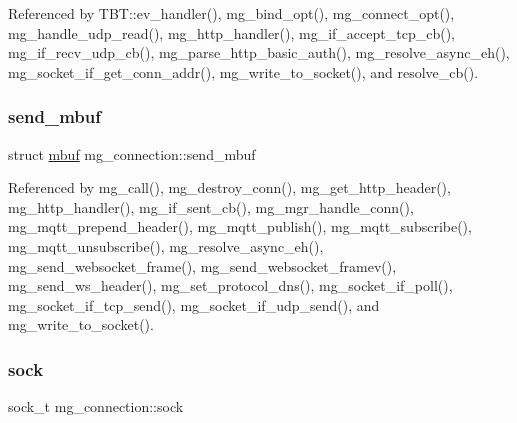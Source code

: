 Referenced by T\+B\+T\+::ev\+\_\+handler(), mg\+\_\+bind\+\_\+opt(), mg\+\_\+connect\+\_\+opt(), mg\+\_\+handle\+\_\+udp\+\_\+read(), mg\+\_\+http\+\_\+handler(), mg\+\_\+if\+\_\+accept\+\_\+tcp\+\_\+cb(), mg\+\_\+if\+\_\+recv\+\_\+udp\+\_\+cb(), mg\+\_\+parse\+\_\+http\+\_\+basic\+\_\+auth(), mg\+\_\+resolve\+\_\+async\+\_\+eh(), mg\+\_\+socket\+\_\+if\+\_\+get\+\_\+conn\+\_\+addr(), mg\+\_\+write\+\_\+to\+\_\+socket(), and resolve\+\_\+cb().

\mbox{\label{structmg__connection_a70076f5da9c9d01e77acb3547941671c_a70076f5da9c9d01e77acb3547941671c}} 
\subsubsection{\texorpdfstring{send\+\_\+mbuf}{send\_mbuf}}
{\footnotesize\ttfamily struct \hyperlink{structmbuf}{mbuf} mg\+\_\+connection\+::send\+\_\+mbuf}



Referenced by mg\+\_\+call(), mg\+\_\+destroy\+\_\+conn(), mg\+\_\+get\+\_\+http\+\_\+header(), mg\+\_\+http\+\_\+handler(), mg\+\_\+if\+\_\+sent\+\_\+cb(), mg\+\_\+mgr\+\_\+handle\+\_\+conn(), mg\+\_\+mqtt\+\_\+prepend\+\_\+header(), mg\+\_\+mqtt\+\_\+publish(), mg\+\_\+mqtt\+\_\+subscribe(), mg\+\_\+mqtt\+\_\+unsubscribe(), mg\+\_\+resolve\+\_\+async\+\_\+eh(), mg\+\_\+send\+\_\+websocket\+\_\+frame(), mg\+\_\+send\+\_\+websocket\+\_\+framev(), mg\+\_\+send\+\_\+ws\+\_\+header(), mg\+\_\+set\+\_\+protocol\+\_\+dns(), mg\+\_\+socket\+\_\+if\+\_\+poll(), mg\+\_\+socket\+\_\+if\+\_\+tcp\+\_\+send(), mg\+\_\+socket\+\_\+if\+\_\+udp\+\_\+send(), and mg\+\_\+write\+\_\+to\+\_\+socket().

\mbox{\label{structmg__connection_a608f2461b3dd53e503d6ed3c84ec55b0_a608f2461b3dd53e503d6ed3c84ec55b0}} 
\subsubsection{\texorpdfstring{sock}{sock}}
{\footnotesize\ttfamily sock\+\_\+t mg\+\_\+connection\+::sock}




